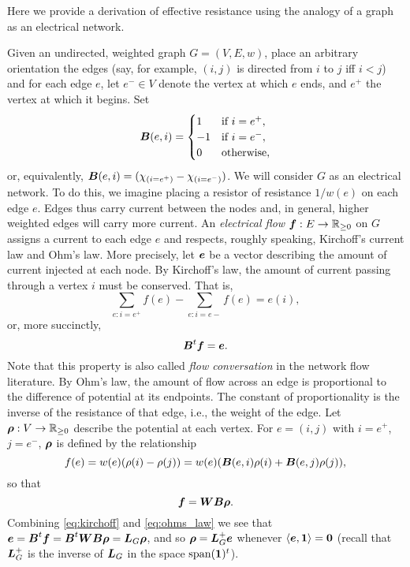 Here we provide a derivation of effective resistance using the analogy of a graph as an electrical network. 

Given an undirected, weighted graph $G=(V,E,w)$, 
place an arbitrary orientation the edges (say, for example, $(i,j)$ is directed from $i$ to $j$ iff $i<j$) and for each edge $e$, let $e^-\in V$ denote the vertex at which $e$ ends, and $e^+$ the vertex at which it  begins. Set 
\begin{equation}
\label{eq:B_G}
\vb*{B}(e,i)=\begin{cases}
1&\text{if }i=e^+,\\
-1&\text{if }i=e^-,\\
0&\text{otherwise},
\end{cases}
\end{equation}
or, equivalently, $\vb*{B}(e,i) = (\chi_{(i=e^+)}-\chi_{(i=e^-)})$.
We will consider $G$ as an electrical network. To do this, we imagine placing a resistor of resistance $1/w(e)$ on each edge $e$. Edges thus carry current between the nodes and, in general, higher weighted edges will carry more current.  
An \emph{electrical flow $\vb*{f}:E\to\mathbb{R}_{\geq 0}$} on $G$ assigns a current to each edge $e$ and respects, roughly speaking, Kirchoff's current law and Ohm's law. More precisely, let $\vb*{e}$ be a vector describing the amount of current injected at each node. By Kirchoff's law, the amount of current passing through a vertex $i$ must be conserved. That is, 
\[\sum_{e:i=e^+}f(e) - \sum_{e:i=e-}f(e) = e(i),\]
or, more succinctly, 
\begin{equation}
\label{eq:kirchoff}
\vb*{B}^t \vb*{f}=\vb*{e}. 
\end{equation}
Note that this property is also called \emph{flow conversation} in the network flow literature. 
By Ohm's law, the amount of flow across an edge is proportional to the difference of potential at its endpoints. The constant of proportionality is the inverse of the resistance of that edge, i.e., the weight of the edge. Let $\vb*{\rho}:V\to\mathbb{R}_{\geq 0}$ describe the potential at each vertex. For $e=(i,j)$ with $i=e^+$, $j=e^-$, $\vb*{\rho}$ is defined by the relationship 
\begin{equation*}
f(e) = w(e)(\rho(i)-\rho(j)) = w(e) (\vb*{B}(e,i)\rho(i) + \vb*{B}(e,j)\rho(j)),
\end{equation*}
so that
\begin{equation}
\label{eq:ohms_law}
\vb*{f}=\vb*{W}\vb*{B}\vb*{\rho}.
\end{equation}
Combining \eqref{eq:kirchoff} and \eqref{eq:ohms_law} we see that $\vb*{e}=\vb*{B}^t \vb*{f}=\vb*{B}^t \vb*{W}\vb*{B} \vb*{\rho} = \vb*{L}_G\vb*{\rho}$, and so $\vb*{\rho} = \vb*{L}_G^+\vb*{e}$ whenever $\langle \vb*{e},\vb{1}\rangle=\vb{0}$ (recall that $\vb*{L}_G^+$ is the inverse of $\vb*{L}_G$ in the space $\textnormal{span}(\vb{1})^t$).  


